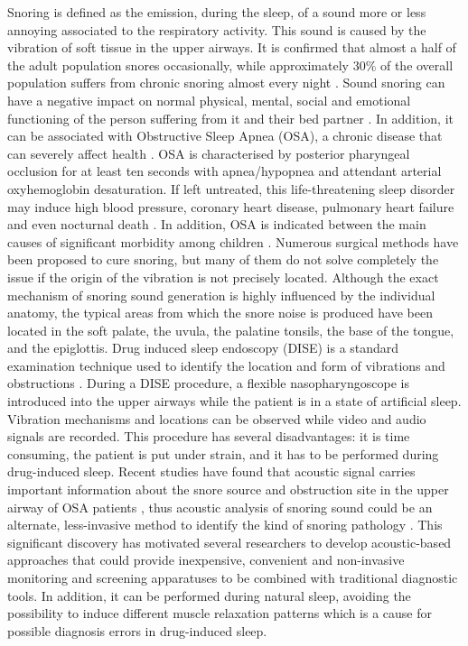 Snoring is defined as the emission, during the sleep, of a sound more or less annoying associated to the respiratory activity. This sound is caused by the vibration of soft tissue in the upper airways. It is confirmed that almost a half of the adult population snores occasionally, while approximately 30\% of the overall population suffers from chronic snoring almost every night \cite{young1997nasal}.
Sound snoring can have a negative impact on normal physical, mental, social and emotional functioning of the person suffering from it and their bed partner \cite{blumen2012snoring}. In addition, it can be associated with Obstructive Sleep Apnea (OSA), a chronic disease that can severely affect health \cite{strollo1996obstructive}. 
OSA is characterised by posterior pharyngeal occlusion for at least ten seconds with apnea/hypopnea and attendant arterial oxyhemoglobin desaturation. If left untreated, this life-threatening sleep disorder may induce high blood pressure, coronary heart disease, pulmonary heart failure and even nocturnal death \cite{banno2007sleep}. In addition, OSA is indicated between the main causes of significant morbidity among children \cite{lumeng2008epidemiology}. Numerous surgical methods have been proposed to cure snoring, but many of them do not solve completely the issue if the origin of the vibration is not precisely located.
Although the exact mechanism of snoring sound generation is highly influenced by the individual anatomy, the typical areas from which the snore noise is produced have been located in the soft palate, the uvula, the palatine tonsils, the base of the tongue, and the epiglottis.
Drug induced sleep endoscopy (DISE) is a standard examination technique used to identify the location and form of vibrations and obstructions \cite{el2003predictive}. During a DISE procedure, a flexible nasopharyngoscope is introduced into the upper airways while the patient is in a state of artificial sleep. Vibration mechanisms and locations can be observed while video and audio signals are recorded. This procedure has several disadvantages: it is time consuming, the patient is put under strain, and it has to be performed during drug-induced sleep. 
Recent studies have found that acoustic signal carries important information about the snore source and obstruction site in the upper airway of OSA patients \cite{pevernagie2010acoustics}, thus acoustic analysis of snoring sound could be an alternate, less-invasive method to identify the kind of snoring pathology \cite{schmitt2016bag}. This significant discovery has motivated several researchers to develop acoustic-based approaches that could provide inexpensive, convenient and non-invasive monitoring and screening apparatuses to be combined with traditional diagnostic tools. In addition,
it can be performed during natural sleep, avoiding the possibility to induce different muscle relaxation patterns which is a cause for possible diagnosis errors in drug-induced sleep.

